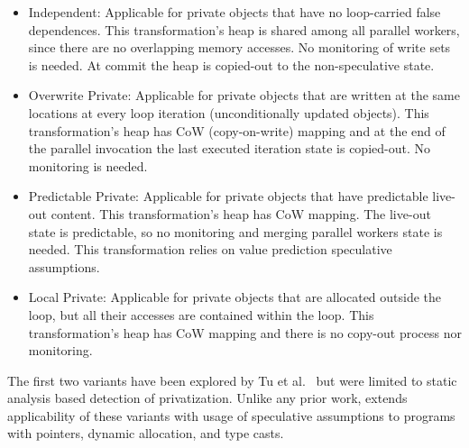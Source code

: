 \begin{itemize}
%
\item Independent: Applicable for private objects that have no
loop-carried false dependences. This transformation's heap is shared
among all parallel workers, since there are no overlapping memory
accesses.
%
No monitoring of write sets is needed. At commit the heap is copied-out
to the non-speculative state.
%

\item Overwrite Private: Applicable for private objects that are
written at the same locations at every loop iteration (unconditionally
updated objects). This transformation's heap has CoW (copy-on-write) mapping
and at the end of the parallel invocation the last executed iteration
state is copied-out. No monitoring is needed.

%

\item Predictable Private: Applicable for private objects that have
predictable live-out content. This transformation's heap has CoW mapping. The
live-out state is predictable, so no monitoring and merging parallel
workers state is needed. This transformation relies on value
prediction speculative assumptions.

\item Local Private: Applicable for private objects that are allocated
outside the loop, but all their accesses are contained within the
loop. This transformation's heap has CoW mapping and there is no copy-out
process nor monitoring.

\end{itemize}

The first two variants have been explored by Tu et
al.~\cite{ARRAY_privatization} but were limited to static analysis
based detection of privatization.  Unlike any prior work, \name
extends applicability of these variants with usage of speculative
assumptions to programs with pointers, dynamic allocation, and type
casts.







